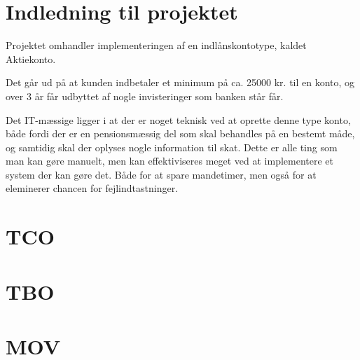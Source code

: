 \documentclass[12pt,a4paper,oneside]{article}
\begin{document}
\section{Indledning til projektet}
Projektet omhandler implementeringen af en indlånskontotype, kaldet Aktiekonto.

Det går ud på at kunden indbetaler et minimum på ca. 25000 kr. til en konto, og
over 3 år får udbyttet af nogle invisteringer som banken står får.

Det IT-mæssige ligger i at der er noget teknisk ved at oprette denne type konto,
både fordi der er en pensionsmæssig del som skal behandles på en bestemt måde, og
samtidig skal der oplyses nogle information til skat. Dette er alle ting som man
kan gøre manuelt, men kan effektiviseres meget ved at implementere et system der
kan gøre det. Både for at spare mandetimer, men også for at eleminerer chancen
for fejlindtastninger.
  \section{TCO}
  

  \section{TBO}
  

  \section{MOV}
  
\end{document}
